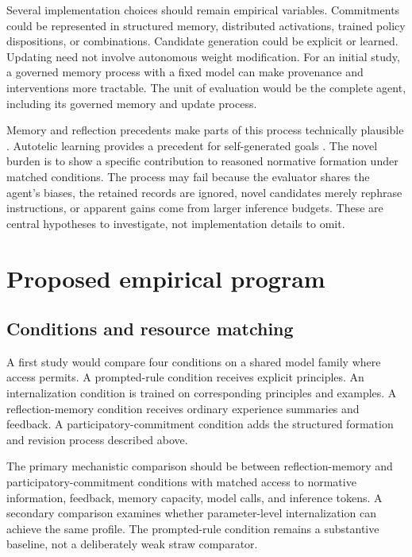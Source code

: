 \documentclass[11pt]{article}
\begin{document}
Several implementation choices should remain empirical variables. Commitments could be represented in structured memory, distributed activations, trained policy dispositions, or combinations. Candidate generation could be explicit or learned. Updating need not involve autonomous weight modification. For an initial study, a governed memory process with a fixed model can make provenance and interventions more tractable. The unit of evaluation would be the complete agent, including its governed memory and update process.

Memory and reflection precedents make parts of this process technically plausible \cite{Park2023,Shinn2023}. Autotelic learning provides a precedent for self-generated goals \cite{Colas2020}. The novel burden is to show a specific contribution to reasoned normative formation under matched conditions. The process may fail because the evaluator shares the agent's biases, the retained records are ignored, novel candidates merely rephrase instructions, or apparent gains come from larger inference budgets. These are central hypotheses to investigate, not implementation details to omit.

\section{Proposed empirical program}

\subsection{Conditions and resource matching}

A first study would compare four conditions on a shared model family where access permits. A prompted-rule condition receives explicit principles. An internalization condition is trained on corresponding principles and examples. A reflection-memory condition receives ordinary experience summaries and feedback. A participatory-commitment condition adds the structured formation and revision process described above.

The primary mechanistic comparison should be between reflection-memory and participatory-commitment conditions with matched access to normative information, feedback, memory capacity, model calls, and inference tokens. A secondary comparison examines whether parameter-level internalization can achieve the same profile. The prompted-rule condition remains a substantive baseline, not a deliberately weak straw comparator.
\end{document}
